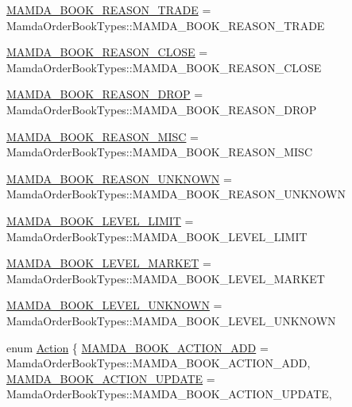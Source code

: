 \begin{CompactItemize}
\item 
\hyperlink{classWombat_1_1MamdaOrderBookPriceLevel_cef40c91570e45ff2313cfe91c42910fd256f37e47081685573fb7e045059830}{MAMDA\_\-BOOK\_\-REASON\_\-TRADE} = Mamda\-Order\-Book\-Types::MAMDA\_\-BOOK\_\-REASON\_\-TRADE
\item 
\hyperlink{classWombat_1_1MamdaOrderBookPriceLevel_cef40c91570e45ff2313cfe91c42910f2efec8bad77b76e5501957e505cf2c74}{MAMDA\_\-BOOK\_\-REASON\_\-CLOSE} = Mamda\-Order\-Book\-Types::MAMDA\_\-BOOK\_\-REASON\_\-CLOSE
\item 
\hyperlink{classWombat_1_1MamdaOrderBookPriceLevel_cef40c91570e45ff2313cfe91c42910fca1ee337f9ae5f55673994055403c64e}{MAMDA\_\-BOOK\_\-REASON\_\-DROP} = Mamda\-Order\-Book\-Types::MAMDA\_\-BOOK\_\-REASON\_\-DROP
\item 
\hyperlink{classWombat_1_1MamdaOrderBookPriceLevel_cef40c91570e45ff2313cfe91c42910f6899575e9eedc8fa1387e74ba5f8c8f1}{MAMDA\_\-BOOK\_\-REASON\_\-MISC} = Mamda\-Order\-Book\-Types::MAMDA\_\-BOOK\_\-REASON\_\-MISC
\item 
\hyperlink{classWombat_1_1MamdaOrderBookPriceLevel_cef40c91570e45ff2313cfe91c42910fe31cc6ee5c713c2cebafd95e72c800ac}{MAMDA\_\-BOOK\_\-REASON\_\-UNKNOWN} = Mamda\-Order\-Book\-Types::MAMDA\_\-BOOK\_\-REASON\_\-UNKNOWN
\item 
\hyperlink{classWombat_1_1MamdaOrderBookPriceLevel_7c24238cb240e1d2d86aaa414198c9968cf3347881521358e8769c0c984fb5b2}{MAMDA\_\-BOOK\_\-LEVEL\_\-LIMIT} = Mamda\-Order\-Book\-Types::MAMDA\_\-BOOK\_\-LEVEL\_\-LIMIT
\item 
\hyperlink{classWombat_1_1MamdaOrderBookPriceLevel_7c24238cb240e1d2d86aaa414198c9966ac370d137039f0bd50f9c3f097452fc}{MAMDA\_\-BOOK\_\-LEVEL\_\-MARKET} = Mamda\-Order\-Book\-Types::MAMDA\_\-BOOK\_\-LEVEL\_\-MARKET
\item 
\hyperlink{classWombat_1_1MamdaOrderBookPriceLevel_7c24238cb240e1d2d86aaa414198c9963c7c9b25ae8c324f9918d4e6defecffc}{MAMDA\_\-BOOK\_\-LEVEL\_\-UNKNOWN} = Mamda\-Order\-Book\-Types::MAMDA\_\-BOOK\_\-LEVEL\_\-UNKNOWN
\item 
enum \hyperlink{classWombat_1_1MamdaOrderBookPriceLevel_bd3407b4250fc6f7a42d94b6d32e358a}{Action} \{ \hyperlink{classWombat_1_1MamdaOrderBookPriceLevel_bd3407b4250fc6f7a42d94b6d32e358a4e7c79b2e4388868a7de8569234dfc1b}{MAMDA\_\-BOOK\_\-ACTION\_\-ADD} =  Mamda\-Order\-Book\-Types::MAMDA\_\-BOOK\_\-ACTION\_\-ADD, 
\hyperlink{classWombat_1_1MamdaOrderBookPriceLevel_bd3407b4250fc6f7a42d94b6d32e358a9b00aebdabd4b5a0d0ed36b86778f5f2}{MAMDA\_\-BOOK\_\-ACTION\_\-UPDATE} =  Mamda\-Order\-Book\-Types::MAMDA\_\-BOOK\_\-ACTION\_\-UPDATE, 

\end{CompactItemize}
